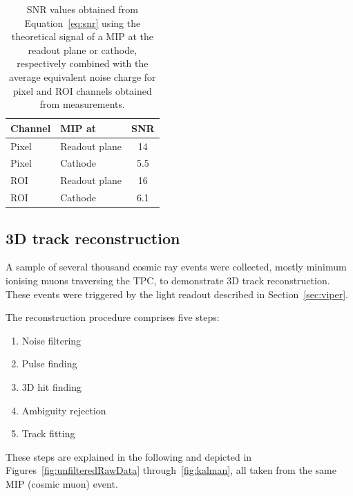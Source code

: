 \documentclass[instruments,article,submit,moreauthors,pdftex]{Definitions/mdpi}
\begin{document}
\begin{table}[htb]
	\centering
	\caption{SNR values obtained from Equation~\eqref{eq:snr} using the theoretical signal of a MIP at the readout plane or cathode, respectively combined with the average equivalent noise charge for pixel and ROI channels obtained from measurements.}
	\label{tab:snr}
	\begin{tabu} to \textwidth {|l|l|S|}
		\hline
		{Channel} &	{MIP at} &			{SNR} \\
		\hline
		\hline
		{Pixel} &	{Readout plane} &	\num{14} \\
		\hline
		{Pixel} &	{Cathode} &			\num{5.5} \\
		\hline
		{ROI} &		{Readout plane} &	\num{16} \\
		\hline
		{ROI} &		{Cathode} &			\num{6.1} \\
		\hline
	\end{tabu}
\end{table}

\clearpage 

\subsection{3D track reconstruction}

A sample of several thousand cosmic ray events were collected, mostly minimum ionising muons traversing the TPC, to demonstrate 3D track reconstruction.
These events were triggered by the light readout described in Section~\ref{sec:viper}.

The reconstruction procedure comprises five steps:
\begin{enumerate}
	\item Noise filtering
	\item Pulse finding
	\item 3D hit finding
	\item Ambiguity rejection
	\item Track fitting
\end{enumerate}

These steps are explained in the following and depicted in Figures~\ref{fig:unfilteredRawData} through~\ref{fig:kalman}, all taken from the same MIP (cosmic muon) event.
\end{document}
